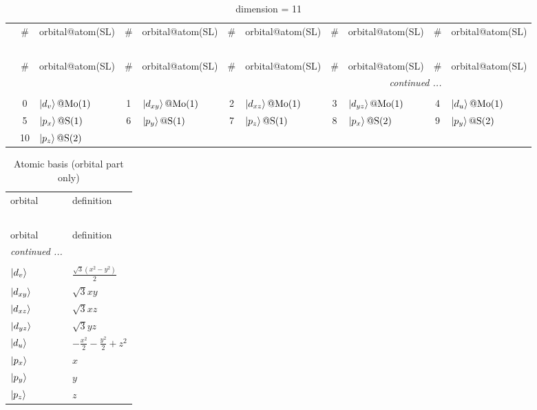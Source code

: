 \documentclass[fleqn,10pt,landscape]{jsarticle}
\begin{document}
\renewcommand{\arraystretch}{1.6}
\begin{longtable}[l]{c|cl|cl|cl|cl|cl}
\captionsetup{justification=raggedright, singlelinecheck=off}
\caption{dimension = 11}
 \\
 \hline \hline
 & \# & orbital@atom(SL) & \# & orbital@atom(SL) & \# & orbital@atom(SL) & \# & orbital@atom(SL) & \# & orbital@atom(SL) \\ \hline \endfirsthead

\multicolumn{10}{l}{\tablename\ \thetable{}} \\
 \hline \hline
 & \# & orbital@atom(SL) & \# & orbital@atom(SL) & \# & orbital@atom(SL) & \# & orbital@atom(SL) & \# & orbital@atom(SL) \\ \hline \endhead

 \hline \hline
\multicolumn{10}{r}{\footnotesize\it continued ...} \\ \endfoot

 \hline \hline
\multicolumn{10}{r}{} \\ \endlastfoot

 & 0 & $\ket{d_{v}}@{\rm Mo}(1)$ & 1 & $\ket{d_{xy}}@{\rm Mo}(1)$ & 2 & $\ket{d_{xz}}@{\rm Mo}(1)$ & 3 & $\ket{d_{yz}}@{\rm Mo}(1)$ & 4 & $\ket{d_{u}}@{\rm Mo}(1)$ \\
& 5 & $\ket{p_{x}}@{\rm S}(1)$ & 6 & $\ket{p_{y}}@{\rm S}(1)$ & 7 & $\ket{p_{z}}@{\rm S}(1)$ & 8 & $\ket{p_{x}}@{\rm S}(2)$ & 9 & $\ket{p_{y}}@{\rm S}(2)$ \\
& 10 & $\ket{p_{z}}@{\rm S}(2)$ &  &  &  &  &  &  &  &  \\
\end{longtable}
\renewcommand{\arraystretch}{1.6}
\begin{longtable}[l]{ll}
\captionsetup{justification=raggedright, singlelinecheck=off}
\caption{Atomic basis (orbital part only)}
 \\
 \hline \hline
orbital & definition \\ \hline \endfirsthead

\multicolumn{1}{l}{\tablename\ \thetable{}} \\
 \hline \hline
orbital & definition \\ \hline \endhead

 \hline \hline
\multicolumn{1}{r}{\footnotesize\it continued ...} \\ \endfoot

 \hline \hline
\multicolumn{1}{r}{} \\ \endlastfoot

$ \ket{d_{v}} $ & $ \frac{\sqrt{3} \left(x^{2} - y^{2}\right)}{2} $ \\
$ \ket{d_{xy}} $ & $ \sqrt{3} x y $ \\
$ \ket{d_{xz}} $ & $ \sqrt{3} x z $ \\
$ \ket{d_{yz}} $ & $ \sqrt{3} y z $ \\
$ \ket{d_{u}} $ & $ - \frac{x^{2}}{2} - \frac{y^{2}}{2} + z^{2} $ \\ \hline
$ \ket{p_{x}} $ & $ x $ \\
$ \ket{p_{y}} $ & $ y $ \\
$ \ket{p_{z}} $ & $ z $ \\
\end{longtable}
\end{document}
